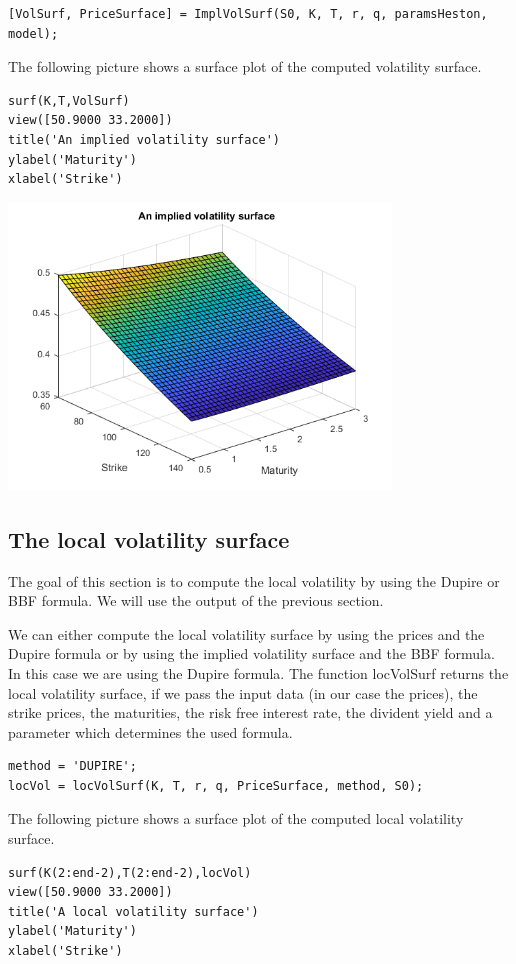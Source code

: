 \begin{verbatim}
[VolSurf, PriceSurface] = ImplVolSurf(S0, K, T, r, q, paramsHeston, model);
\end{verbatim}
\begin{par}
The following picture shows a surface plot of the computed volatility surface.
\end{par} \vspace{1em}
\begin{verbatim}
surf(K,T,VolSurf)
view([50.9000 33.2000])
title('An implied volatility surface')
ylabel('Maturity')
xlabel('Strike')
\end{verbatim}

\includegraphics [width=4in]{fig/ScriptM_01.png}


\subsection{The local volatility surface}

\begin{par}
The goal of this section is to compute the local volatility by using the Dupire or BBF formula. We will use the output of the previous section.
\end{par} \vspace{1em}
\begin{par}
We can either compute the local volatility surface by using the prices and the Dupire formula or by using the implied volatility surface and the BBF formula. In this case we are using the Dupire formula. The function locVolSurf returns the local volatility surface, if we pass the input data (in our case the prices), the strike prices, the maturities, the risk free interest rate, the divident yield and a parameter which determines the used formula.
\end{par} \vspace{1em}
\begin{verbatim}
method = 'DUPIRE';
locVol = locVolSurf(K, T, r, q, PriceSurface, method, S0);
\end{verbatim}
\begin{par}
The following picture shows a surface plot of the computed local volatility surface.
\end{par} \vspace{1em}
\begin{verbatim}
surf(K(2:end-2),T(2:end-2),locVol)
view([50.9000 33.2000])
title('A local volatility surface')
ylabel('Maturity')
xlabel('Strike')
\end{verbatim}

